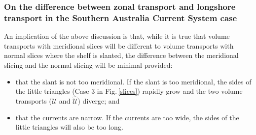 \documentclass[preprint,3p,review,12pt]{elsarticle}
\begin{document}
\subsubsection{On the difference between zonal transport and longshore transport in the Southern Australia Current System case}
An implication of the above discussion is that, while it is true that volume transports with meridional slices will be different to volume transports with normal slices where the shelf is slanted, the difference between the meridional slicing and the normal slicing will be minimal provided:
%
\begin{itemize}
    \item that the slant is not too meridional. If the slant is too meridional, the sides of the little triangles (Case 3 in Fig.\,\ref{slices}) rapidly grow and the two volume transports ($\mathcal{U}$ and $\hat{\mathcal{U}}$) diverge; and
%
    \item that the currents are narrow. If the currents are too wide, the sides of the little triangles will also be too long.
\end{itemize}
\end{document}
